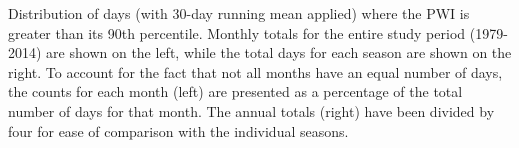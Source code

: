 \label{fig:annual_distribution}
Distribution of days (with 30-day running mean applied) where the PWI is greater than its 90th percentile. Monthly totals for the entire study period (1979-2014) are shown on the left, while the total days for each season are shown on the right. To account for the fact that not all months have an equal number of days, the counts for each month (left) are presented as a percentage of the total number of days for that month. The annual totals (right) have been divided by four for ease of comparison with the individual seasons.   